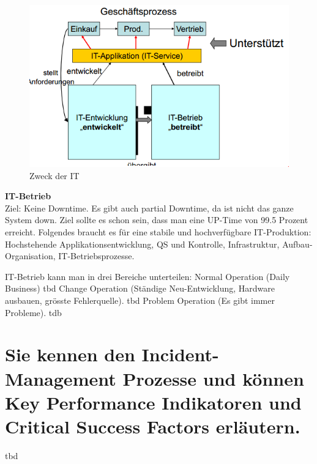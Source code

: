 \begin{figure}[h!]
	\centering
	\includegraphics{fig/zweck-der-it}
	\caption{Zweck der IT}
\end{figure}

\textbf{IT-Betrieb}\\
Ziel: Keine Downtime. Es gibt auch partial Downtime, da ist nicht das ganze System down. Ziel sollte es schon sein, dass man eine UP-Time von 99.5 Prozent erreicht. Folgendes braucht es für eine stabile und hochverfügbare IT-Produktion: Hochstehende Applikationsentwicklung, QS und Kontrolle, Infrastruktur, Aufbau-Organisation, IT-Betriebsprozesse.

IT-Betrieb kann man in drei Bereiche unterteilen: 
Normal Operation (Daily Business)
tbd
Change Operation (Ständige Neu-Entwicklung, Hardware ausbauen, grösste Fehlerquelle).
tbd
Problem Operation (Es gibt immer Probleme).
tdb
	
\section{Sie kennen den Incident-Management Prozesse und
	können Key Performance Indikatoren und Critical Success
	Factors erläutern.}

tbd